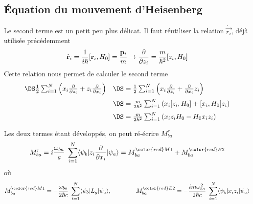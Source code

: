 \subsection{Équation du mouvement d'Heisenberg}
Le second terme est un petit peu plus délicat. Il faut réutiliser la relation $\dot{\vec{r_i}}$, 
déjà utilisée précédemment
\begin{equation}
\dot{ {\bf r} }
 _{i} = \frac{1}{i \hbar} [  {\bf r}_i, H_0 ] = 
\frac{  {\bf p}_i}{m}
\rightarrow   \frac{\partial}{\partial z_i} 
= \frac{m}{\hbar^2}
[z_i , H_0]
\end{equation}
Cette relation nous permet de calculer le second terme
\begin{equation}
\begin{array}{ll}
\DS\frac{1}{2}  
 \sum_{i= 1}^N
\left(  
 x_i \frac{\partial}{\partial z_i} 
+ z_i \frac{\partial}{\partial x_i} 
\right)  
&\DS=
\frac{1}{2}  
 \sum_{i= 1}^N
\left(  
 x_i \frac{\partial}{\partial z_i} 
+ \frac{\partial}{\partial x_i}  z_i 
\right)\vspace{2mm}\\
&\DS =
\frac{m}{2 \hbar^2}  
 \sum_{i= 1}^N
\left(  
 x_i [z_i, H_0 ] + [x_i, H_0] z_i 
\right)\vspace{2mm}\\
&\DS=
\frac{m}{2 \hbar^2}  
 \sum_{i= 1}^N
\left(  
 x_i z_i H_0  -  H_0 x_i  z_i 
\right)
\end{array}
\end{equation}

Les deux termes étant développés, on peut ré-écrire $M^r_{ba}$
\begin{equation}
M_{ba}^r =   i \frac{\omega_{ba}}{c} \; 
\sum_{i= 1}^N 
 \langle \psi_b \vert 
 z_i \frac{\partial}{\partial x_i} \vert \psi_a \rangle
=        M_{ba}^{{\color{red} M1}}  
+ M_{ba}^{{\color{red} E2}}
\end{equation}
où
\begin{equation}
 M_{ba}^{{\color{red} M1}}   =   - \frac{\omega_{ba}}{2 \hbar c} \; 
\sum_{i= 1}^N 
 \langle \psi_b \vert 
 L_y \vert \psi_a \rangle,\qquad\qquad
  M_{ba}^{{\color{red} E2}}    =   - \frac{i m \omega_{ba}^2}{2 \hbar c} \; 
\sum_{i= 1}^N 
 \langle \psi_b \vert 
 x_i z_i  \vert \psi_a \rangle
\end{equation}


